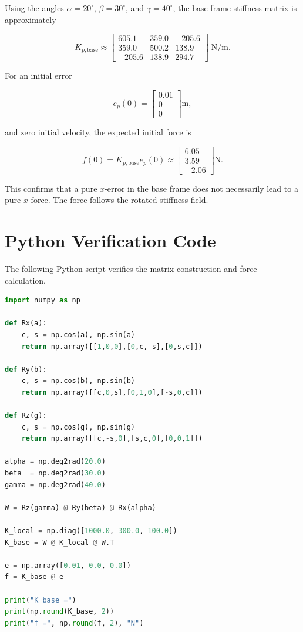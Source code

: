 Using the angles
\(\alpha=20^\circ\), \(\beta=30^\circ\), and \(\gamma=40^\circ\), the
base-frame stiffness matrix is approximately

\begin{equation}
K_{p,\mathrm{base}}
\approx
\begin{bmatrix}
605.1 & 359.0 & -205.6\\
359.0 & 500.2 & 138.9\\
-205.6 & 138.9 & 294.7
\end{bmatrix}
\;\mathrm{N/m}.
\end{equation}

For an initial error

\begin{equation}
e_p(0)=
\begin{bmatrix}
0.01\\0\\0
\end{bmatrix}
\mathrm{m},
\end{equation}

and zero initial velocity, the expected initial force is

\begin{equation}
f(0)
=
K_{p,\mathrm{base}}e_p(0)
\approx
\begin{bmatrix}
6.05\\3.59\\-2.06
\end{bmatrix}
\mathrm{N}.
\end{equation}

This confirms that a pure \(x\)-error in the base frame does not necessarily
lead to a pure \(x\)-force. The force follows the rotated stiffness field.

\section{Python Verification Code}

The following Python script verifies the matrix construction and force
calculation.

\begin{lstlisting}[style=cppstyle, language=Python,
  caption={Python verification of the rotated stiffness matrix},
  label={lst:exp1_rotated_python}]
import numpy as np

def Rx(a):
    c, s = np.cos(a), np.sin(a)
    return np.array([[1,0,0],[0,c,-s],[0,s,c]])

def Ry(b):
    c, s = np.cos(b), np.sin(b)
    return np.array([[c,0,s],[0,1,0],[-s,0,c]])

def Rz(g):
    c, s = np.cos(g), np.sin(g)
    return np.array([[c,-s,0],[s,c,0],[0,0,1]])

alpha = np.deg2rad(20.0)
beta  = np.deg2rad(30.0)
gamma = np.deg2rad(40.0)

W = Rz(gamma) @ Ry(beta) @ Rx(alpha)

K_local = np.diag([1000.0, 300.0, 100.0])
K_base = W @ K_local @ W.T

e = np.array([0.01, 0.0, 0.0])
f = K_base @ e

print("K_base =")
print(np.round(K_base, 2))
print("f =", np.round(f, 2), "N")
\end{lstlisting}


